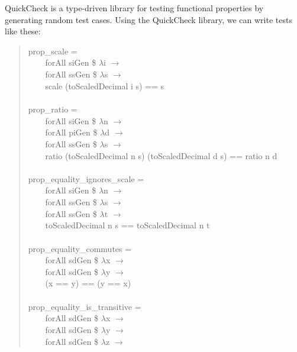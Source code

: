\documentclass[prodmode,acmtoplas]{acmsmall}
\begin{document}
QuickCheck \cite{QC1,QC2} is a type-driven library for testing functional
properties by generating random test cases.
Using the QuickCheck \cite{QC4} library, we can write tests like these:
\begin{quote}
\begin{tabbing}
\sffamily prop\_scale =\\
\verb|    |\sffamily    forAll siGen \$ $\lambda$i $\rightarrow$  \\
\verb|    |\sffamily    forAll ssGen \$ $\lambda$s $\rightarrow$  \\
\verb|    |\sffamily    scale (toScaledDecimal i s) == s\\
\\
\sffamily prop\_ratio =\\
\verb|    |\sffamily    forAll siGen \$ $\lambda$n $\rightarrow$\\
\verb|    |\sffamily    forAll piGen \$ $\lambda$d $\rightarrow$  \\
\verb|    |\sffamily    forAll ssGen \$ $\lambda$s $\rightarrow$\\
\verb|    |\sffamily    ratio (toScaledDecimal n s) (toScaledDecimal d s) == ratio n d\\
\\
\sffamily prop\_equality\_ignores\_scale =\\
\verb|    |\sffamily    forAll siGen \$ $\lambda$n $\rightarrow$\\
\verb|    |\sffamily    forAll ssGen \$ $\lambda$s $\rightarrow$\\
\verb|    |\sffamily    forAll ssGen \$ $\lambda$t $\rightarrow$\\
\verb|    |\sffamily    toScaledDecimal n s == toScaledDecimal n t\\
\\
\sffamily prop\_equality\_commutes =\\
\verb|    |\sffamily    forAll sdGen \$ $\lambda$x $\rightarrow$  \\
\verb|    |\sffamily    forAll sdGen \$ $\lambda$y $\rightarrow$\\
\verb|    |\sffamily    (x == y) == (y == x)\\
\\
\sffamily prop\_equality\_is\_transitive =\\
\verb|    |\sffamily    forAll sdGen \$ $\lambda$x $\rightarrow$\\
\verb|    |\sffamily    forAll sdGen \$ $\lambda$y $\rightarrow$\\
\verb|    |\sffamily    forAll sdGen \$ $\lambda$z $\rightarrow$\\

\end{tabbing}
\end{quote}
\end{document}
